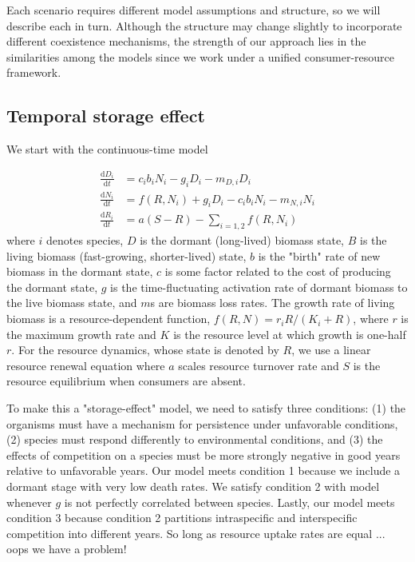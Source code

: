 \documentclass[12pt]{article}
\begin{document}
Each scenario requires different model assumptions and structure, so we will describe each in turn. Although the structure may change slightly to incorporate different coexistence mechanisms, the strength of our approach lies in the similarities among the models since we work under a unified consumer-resource framework.

\subsection{Temporal storage effect}
We start with the continuous-time model

\begin{align}
\frac{\text{d}D_{i}}{\text{d}t} &= c_{i}b_{i}N_{i} - g_{i}D_{i} - m_{D,i}D_{i}\\
\frac{\text{d}N_{i}}{\text{d}t} &= f(R,N_{i}) + g_{i}D_{i} - c_{i}b_{i}N_{i} - m_{N,i}N_{i}\\
\frac{\text{d}R_{i}}{\text{d}t} &= a(S - R) - \sum\limits_{i=1,2}f(R,N_{i})
\end{align}
where $i$ denotes species, $D$ is the dormant (long-lived) biomass state, $B$ is the living biomass (fast-growing, shorter-lived) state, $b$ is the "birth" rate of new biomass in the dormant state, $c$ is some factor related to the cost of producing the dormant state, $g$ is the time-fluctuating activation rate of dormant biomass to the live biomass state, and $m$s are biomass loss rates. The growth rate of living biomass is a resource-dependent function, $f(R,N) = r_{i}R/(K_{i}+R)$, where $r$ is the maximum growth rate and $K$ is the resource level at which growth is one-half $r$. For the resource dynamics, whose state is denoted by $R$, we use a linear resource renewal equation where $a$ scales resource turnover rate and $S$ is the resource equilibrium when consumers are absent.

To make this a "storage-effect" model, we need to satisfy three conditions: (1) the organisms must have a mechanism for persistence under unfavorable conditions, (2) species must respond differently to environmental conditions, and (3) the effects of competition on a species must be more strongly negative in good years relative to unfavorable years. Our model meets condition 1 because we include a dormant stage with very low death rates. We satisfy condition 2 with model whenever $g$ is not perfectly correlated between species. Lastly, our model meets condition 3 because condition 2 partitions intraspecific and interspecific competition into different years. So long as resource uptake rates are equal ... oops we have a problem!  
\end{document}
